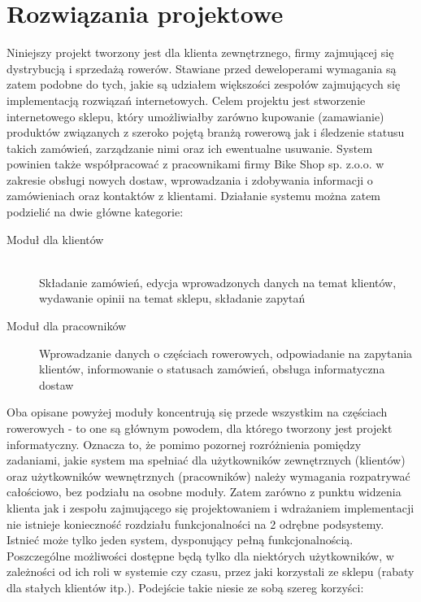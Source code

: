 \section{Rozwiązania projektowe}

Niniejszy projekt tworzony jest dla klienta zewnętrznego, firmy zajmującej się
dystrybucją i sprzedażą rowerów. Stawiane przed deweloperami wymagania są zatem
podobne do tych, jakie są udziałem większości zespołów zajmujących się
implementacją rozwiązań internetowych. Celem projektu jest stworzenie
internetowego sklepu, który umożliwiałby zarówno kupowanie (zamawianie)
produktów związanych z szeroko pojętą branżą rowerową jak i śledzenie statusu
takich zamówień, zarządzanie nimi oraz ich ewentualne usuwanie. System powinien
także współpracować z pracownikami firmy Bike Shop sp. z.o.o. w zakresie obsługi
nowych dostaw, wprowadzania i zdobywania informacji o zamówieniach oraz kontaktów z
klientami. Działanie systemu można zatem podzielić na dwie główne kategorie:

\begin{description}
	\item[Moduł dla klientów] \hfill \\
	Składanie zamówień, edycja wprowadzonych danych na temat klientów, wydawanie
	opinii na temat sklepu, składanie zapytań
	\item[Moduł dla pracowników]
	Wprowadzanie danych o częściach rowerowych, odpowiadanie na zapytania klientów,
	informowanie o statusach zamówień, obsługa informatyczna dostaw
\end{description}

Oba opisane powyżej moduły koncentrują się przede wszystkim na częściach
rowerowych - to one są głównym powodem, dla którego tworzony jest projekt
informatyczny. Oznacza to, że pomimo pozornej rozróżnienia pomiędzy zadaniami,
jakie system ma spełniać dla użytkowników zewnętrznych (klientów) oraz
użytkowników wewnętrznych (pracowników) należy wymagania rozpatrywać całościowo,
bez podziału na osobne moduły. Zatem zarówno z punktu widzenia klienta jak i
zespołu zajmującego się projektowaniem i wdrażaniem implementacji nie istnieje
konieczność rozdziału funkcjonalności na 2 odrębne podsystemy. Istnieć może
tylko jeden system, dysponujący pełną funkcjonalnością. Poszczególne możliwości
dostępne będą tylko dla niektórych użytkowników, w zależności od ich roli w
systemie czy czasu, przez jaki korzystali ze sklepu (rabaty dla stałych
klientów itp.). Podejście takie niesie ze sobą szereg korzyści:

